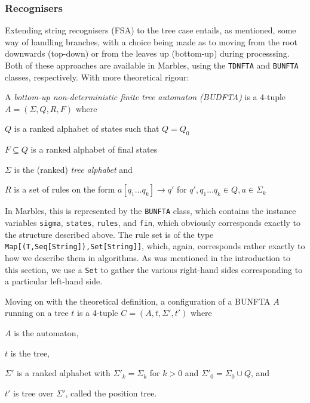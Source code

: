 \subsubsection{Recognisers}

Extending string recognisers (FSA) to the tree case entails, as mentioned,
some way of handling branches, with a choice being made as to moving from
the root downwards (top-down) or from the leaves up (bottom-up) during
processsing. Both of these approaches are available in Marbles, using the
\texttt{TDNFTA} and \texttt{BUNFTA} classes, respectively. With more
theoretical rigour:

A \emph{bottom-up non-deterministic finite tree automaton (BUDFTA)} is a
4-tuple $A = (\Sigma, Q, R, F)$ where
\begin{compactitem}
\item $Q$ is a ranked alphabet of states such that $Q = Q_0$
\item $F \subseteq Q$ is a ranked alphabet of final states
\item $\Sigma$ is the (ranked) \emph{tree alphabet} and
\item $R$ is a set of rules on the form
$a[q_1 \ldots q_k] \rightarrow q'$ for $q',q_1 \ldots q_k \in Q, a \in
\Sigma_k$
\end{compactitem}
\vspace{0.4cm}

In Marbles, this is represented by the \texttt{BUNFTA} class, which
contains the instance variables \texttt{sigma}, \texttt{states},
\texttt{rules}, and \texttt{fin}, which obviously corresponds exactly to
the structure described above. The rule set is of the type
\texttt{Map[(T,Seq[String]),Set[String]]}, which, again, corresponds rather
exactly to how we describe them in algorithms. As was mentioned in the
introduction to this section, we use a \texttt{Set} to gather the various
right-hand sides corresponding to a particular left-hand side.

Moving on with the theoretical definition, a configuration of a BUNFTA $A$
running on a tree $t$ is a 4-tuple
$C = (A, t, \Sigma', t')$ where
\begin{compactitem}
\item $A$ is the automaton,
\item $t$ is the tree,
\item $\Sigma'$ is a ranked alphabet with $\Sigma'_k = \Sigma_k$ for $k >
$0 and $\Sigma'_0 = \Sigma_0 \cup Q$, and
\item $t'$ is tree over $\Sigma'$, called the position tree.
\end{compactitem}
\vspace{0.5cm}

